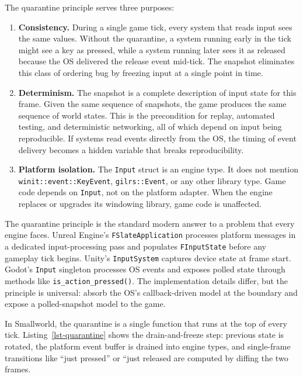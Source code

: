 \documentclass[
  11pt,
  letterpaper,
  DIV=11,
  numbers=noendperiod,
  twoside,
  open=right]{scrreprt}
\begin{document}
The quarantine principle serves three purposes:

\begin{enumerate}
\def\labelenumi{\arabic{enumi}.}
\item
  \textbf{Consistency.} During a single game tick, every system that
  reads input sees the same values. Without the quarantine, a system
  running early in the tick might see a key as pressed, while a system
  running later sees it as released because the OS delivered the release
  event mid-tick. The snapshot eliminates this class of ordering bug by
  freezing input at a single point in time.
\item
  \textbf{Determinism.} The snapshot is a complete description of input
  state for this frame. Given the same sequence of snapshots, the game
  produces the same sequence of world states. This is the precondition
  for replay, automated testing, and deterministic networking, all of
  which depend on input being reproducible. If systems read events
  directly from the OS, the timing of event delivery becomes a hidden
  variable that breaks reproducibility.
\item
  \textbf{Platform isolation.} The \texttt{Input} struct is an engine
  type. It does not mention \texttt{winit::event::KeyEvent},
  \texttt{gilrs::Event}, or any other library type. Game code depends on
  \texttt{Input}, not on the platform adapter. When the engine replaces
  or upgrades its windowing library, game code is unaffected.
\end{enumerate}



The quarantine principle is the standard modern answer to a problem that
every engine faces. Unreal Engine's \texttt{FSlateApplication} processes
platform messages in a dedicated input-processing pass and populates
\texttt{FInputState} before any gameplay tick begins. Unity's
\texttt{InputSystem} captures device state at frame start. Godot's
\texttt{Input} singleton processes OS events and exposes polled state
through methods like \texttt{is\_action\_pressed()}. The implementation
details differ, but the principle is universal: absorb the OS's
callback-driven model at the boundary and expose a polled-snapshot model
to the game.

In Smallworld, the quarantine is a single function that runs at the top
of every tick. Listing~\ref{lst-quarantine} shows the drain-and-freeze
step: previous state is rotated, the platform event buffer is drained
into engine types, and single-frame transitions like ``just pressed'' or
``just released are computed by diffing the two frames.
\end{document}

